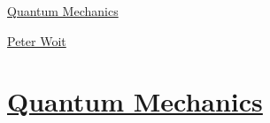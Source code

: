 \documentclass[11pt]{article}
\begin{document}
	\kaishu 
	\setcounter{section}{0}
	\begin{center}
		{\LARGE  \href{https://en.wikipedia.org/wiki/Quantum_mechanics}{Quantum Mechanics}}
		
		
		{\large \href{https://www.math.columbia.edu/~woit/}{Peter Woit}}
	\end{center}
\setcounter{page}{1}



\vspace{-1cm}

\section*{\href{https://www.youtube.com/playlist?list=PLOaEOh8qMwDLoBJinaH3p31edODHdlb93}{Quantum Mechanics }}
\end{document}
